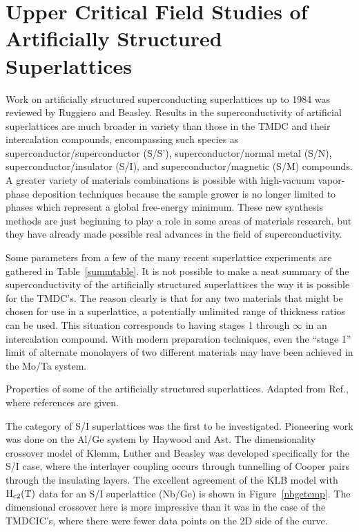\section{Upper Critical Field Studies of Artificially Structured 
Superlattices}
\label{assl}

	Work on artificially structured superconducting superlattices up to
1984 was reviewed by Ruggiero and Beasley.\cite{ruggiero85}  Results in the
superconductivity  of artificial superlattices  are much broader in variety
than those in the TMDC and their intercalation compounds, encompassing such
species  as    superconductor/superconductor (S/S'),  superconductor/normal
metal  (S/N), superconductor/insulator (S/I), and   superconductor/magnetic
(S/M) compounds.  A greater variety  of materials combinations is  possible
with high-vacuum   vapor-phase  deposition   techniques because  the sample
grower is no longer limited to phases which  represent a global free-energy
minimum.  These new synthesis methods are just beginning to play  a role in
some areas of materials research, but  they have already made possible real
advances in the field of superconductivity.
        
        Some   parameters from  a  few of  the   many  recent  superlattice
experiments are gathered in  Table~\ref{summtable}.  It  is not possible to
make a neat summary of the superconductivity of the artificially structured
superlattices the way it is possible for the TMDC's.  The reason clearly is
that for any two materials that might be chosen for use  in a superlattice,
a  potentially unlimited   range of  thickness ratios can    be used.  This
situation  corresponds  to   having  stages  1   through $\infty$   in   an
intercalation compound.  With modern preparation techniques, even the
``stage 1'' limit of alternate monolayers of two different materials may have
been achieved in the Mo/Ta system.\cite{makous87}


\begin{table}
\vspace{18cm}
\caption[Properties of some of the artificially structured superlattices.]
{Properties of some of the artificially structured superlattices.  Adapted
from Ref.\cite{ruggiero85}, where references are given.}
\label{summtable}
\end{table}


	The category of S/I superlattices was the first to be investigated.
Pioneering   work was    done on   the    Al/Ge    system  by   Haywood and
Ast.\cite{haywood78}  The dimensionality  crossover model  of Klemm, Luther
and  Beasley\cite{klemm75} was developed  specifically  for the  S/I  case,
where the interlayer coupling  occurs through  tunnelling  of Cooper  pairs
through  the insulating layers.  The  excellent agreement of the KLB
model with $\rm H_{c2}(T)$ data for an S/I superlattice (Nb/Ge) is shown in
Figure~\ref{nbgetemp}.   The dimensional crossover  here is more impressive
than it was in the case of the TMDCIC's, where there were fewer data points
on the 2D side of the curve.


